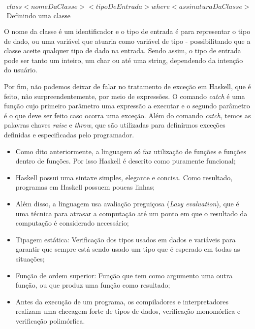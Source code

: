 \documentclass[
  12pt,				         %
  oneside,			       %
  a4paper,			       %
  english,		       	 %
  brazil,			      	 %
]{abntex2}
\begin{document}
    \begin{gather*}
      class<nomeDaClasse><tipoDeEntrada>where<assinaturaDaClasse> \\
      \text{Definindo uma classe}
    \end{gather*}

    O nome da classe é um identificador e o tipo de entrada é para representar o tipo de dado, ou uma variável que atuaria como variável de tipo - possibilitando que a classe aceite qualquer tipo
    de dado na entrada. Sendo assim, o tipo de entrada pode ser tanto um inteiro, um char ou até uma string, dependendo da intenção do usuário.

    Por fim, não podemos deixar de falar no tratamento de exceção em Haskell, que é feito, não surpreendentemente, por meio de expressões. O comando \emph{catch} é uma função cujo primeiro parâmetro
    uma expressão a executar e o segundo parâmetro é o que deve ser feito caso ocorra uma exceção. Além do comando \emph{catch}, temos as palavras chaves \emph{raise} e \emph{throw}, que são utilizadas para definirmos
    exceções definidas e especificadas pelo programador.

    \begin{itemize}
      \item Como dito anteriormente, a linguagem só faz utilização de funções e funções dentro de funções. Por isso
      Haskell é descrito como puramente funcional;
      \item Haskell possui uma sintaxe simples, elegante e concisa. Como resultado, programas em Haskell possuem 
      poucas linhas;
      \item Além disso, a linguagem usa avaliação preguiçosa (\emph{Lazy evaluation}), que é uma técnica para atrasar a computação 
      até um ponto em que o resultado da computação é considerado necessário;
      \item Tipagem estática: Verificação dos tipos usados em dados e variáveis para 
      garantir que sempre está sendo usado um tipo que é esperado em todas as situações; 
      \item Função de ordem superior: Função que tem como argumento uma outra função, ou que produz 
      uma função como resultado;
      \item Antes da execução de um programa, os compiladores e interpretadores realizam uma checagem forte de tipos
      de dados, verificação monomórfica e verificação polimórfica.
    \end{itemize}
\end{document}
